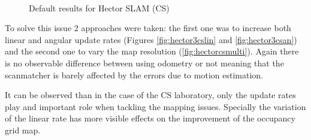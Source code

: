 \begin{figure}[h]
  \centering
   \quad
   \\
  \caption{Default results for Hector SLAM (CS)}
  \label{fig:hector3defcs}
\end{figure}  

To solve this issue 2 approaches were taken: the first one was to increase both linear and angular update rates (Figures \ref{fig:hector3cslin} and \ref{fig:hector3csan}) and the second one to vary the map resolution (\ref{fig:hectorcsmulti}). Again there is no observable difference between using odometry or not meaning that the scanmatcher is barely affected by the errors due to motion estimation.

It can be observed than in the case of the CS laboratory, only the update rates play and important role when tackling the mapping issues. Specially the variation of the linear rate has more visible effects on the improvement of the occupancy grid map.

